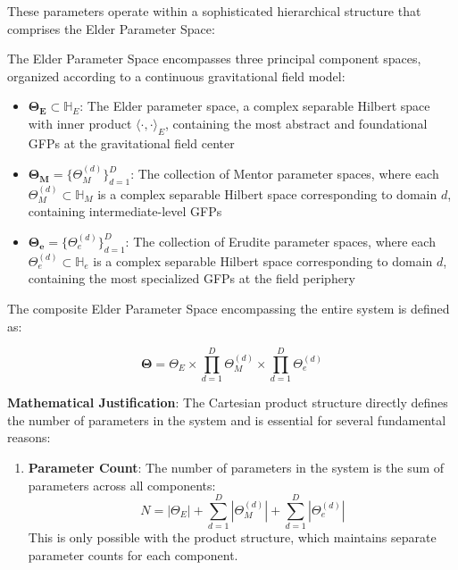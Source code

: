 These parameters operate within a sophisticated hierarchical structure that comprises the Elder Parameter Space:

\begin{definition}
The Elder Parameter Space encompasses three principal component spaces, organized according to a continuous gravitational field model:

\begin{itemize}
    \item $\boldsymbol{\Theta_E} \subset \mathbb{H}_E$: The Elder parameter space, a complex separable Hilbert space with inner product $\langle \cdot, \cdot \rangle_E$, containing the most abstract and foundational GFPs at the gravitational field center
    
    \item $\boldsymbol{\Theta_M} = \{\Theta_M^{(d)}\}_{d=1}^D$: The collection of Mentor parameter spaces, where each $\Theta_M^{(d)} \subset \mathbb{H}_M$ is a complex separable Hilbert space corresponding to domain $d$, containing intermediate-level GFPs
    
    \item $\boldsymbol{\Theta_e} = \{\Theta_e^{(d)}\}_{d=1}^D$: The collection of Erudite parameter spaces, where each $\Theta_e^{(d)} \subset \mathbb{H}_e$ is a complex separable Hilbert space corresponding to domain $d$, containing the most specialized GFPs at the field periphery
\end{itemize}

The composite Elder Parameter Space encompassing the entire system is defined as:

\begin{equation}
\boldsymbol{\Theta} = \Theta_E \times \prod_{d=1}^D \Theta_M^{(d)} \times \prod_{d=1}^D \Theta_e^{(d)}
\end{equation}

\textbf{Mathematical Justification}: The Cartesian product structure directly defines the number of parameters in the system and is essential for several fundamental reasons:
\begin{enumerate}
    \item \textbf{Parameter Count}: The number of parameters in the system is the sum of parameters across all components:
    \begin{equation}
    N = |\Theta_E| + \sum_{d=1}^D |\Theta_M^{(d)}| + \sum_{d=1}^D |\Theta_e^{(d)}|
    \end{equation}
    This is only possible with the product structure, which maintains separate parameter counts for each component.
    

\end{enumerate}
\end{definition}

